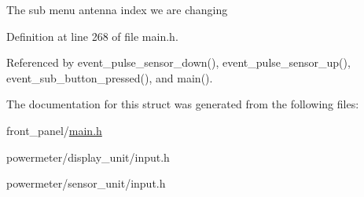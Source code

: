The sub menu antenna index we are changing 

Definition at line 268 of file main.h.

Referenced by event\_\-pulse\_\-sensor\_\-down(), event\_\-pulse\_\-sensor\_\-up(), event\_\-sub\_\-button\_\-pressed(), and main().

The documentation for this struct was generated from the following files:\begin{CompactItemize}
\item 
front\_\-panel/\hyperlink{front__panel_2main_8h}{main.h}\item 
powermeter/display\_\-unit/input.h\item 
powermeter/sensor\_\-unit/input.h\end{CompactItemize}
